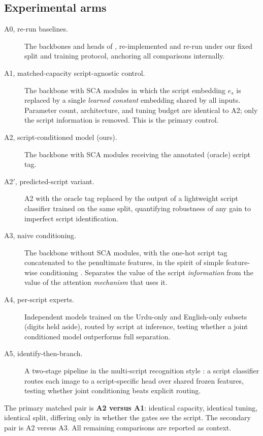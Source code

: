 \documentclass[11pt,a4paper]{article}
\begin{document}
\subsection{Experimental arms}

\begin{description}
  \item[A0, re-run baselines.] The backbones and heads of
  \citet{kashif2026}, re-implemented and re-run under our fixed split
  and training protocol, anchoring all comparisons internally.
  \item[A1, matched-capacity script-agnostic control.] The backbone
  with SCA modules in which the script embedding $e_s$ is replaced by
  a single \emph{learned constant} embedding shared by all inputs.
  Parameter count, architecture, and tuning budget are identical to
  A2; only the script information is removed. This is the primary
  control.
  \item[A2, script-conditioned model (ours).] The backbone with SCA
  modules receiving the annotated (oracle) script tag.
  \item[A2$'$, predicted-script variant.] A2 with the oracle tag
  replaced by the output of a lightweight script classifier trained
  on the same split, quantifying robustness of any gain to imperfect
  script identification.
  \item[A3, naive conditioning.] The backbone without SCA modules,
  with the one-hot script tag concatenated to the penultimate
  features, in the spirit of simple feature-wise conditioning
  \citep{perez2018film}. Separates the value of the script
  \emph{information} from the value of the attention \emph{mechanism}
  that uses it.
  \item[A4, per-script experts.] Independent models trained on the
  Urdu-only and English-only subsets (digits held aside), routed by
  script at inference, testing whether a joint conditioned model
  outperforms full separation.
  \item[A5, identify-then-branch.] A two-stage pipeline in the
  multi-script recognition style \citep{multrenets2020}: a script
  classifier routes each image to a script-specific head over shared
  frozen features, testing whether joint conditioning beats explicit
  routing.
\end{description}

The primary matched pair is \textbf{A2 versus A1}: identical
capacity, identical tuning, identical split, differing only in
whether the gates see the script. The secondary pair is A2 versus A3.
All remaining comparisons are reported as context.
\end{document}
